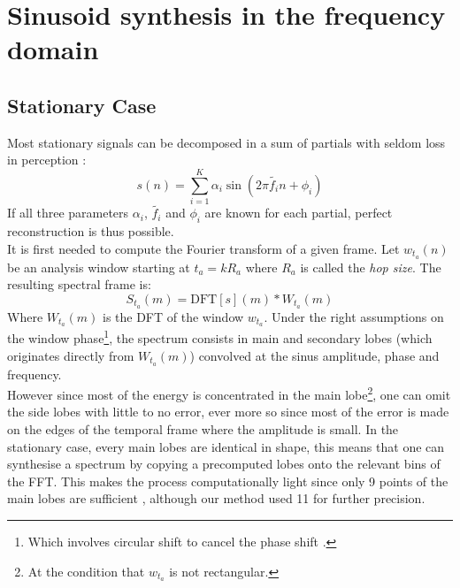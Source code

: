 \documentclass[]{article}
\begin{document}
\section{Sinusoid synthesis in the frequency domain}

\subsection{Stationary Case}
\hspace{15pt}Most stationary signals can be decomposed in a sum of partials with seldom loss in perception :
\begin{equation}
s(n) = \sum_{i=1}^{K}\alpha_i \sin(2\pi \tilde{f_i} n + \phi_{i})
\end{equation}
If all three parameters $\alpha_i$, $\tilde{f_i}$ and $\phi_{i}$ are known for each partial, perfect reconstruction is thus possible.\\
It is first needed to compute the Fourier transform of a given frame. Let $w_{t_a}(n)$ be an analysis window starting at $t_a = kR_a$ where $R_a$ is called the \emph{hop size}. The resulting spectral frame is:
\begin{equation}
S_{t_a}(m) = \text{DFT}[s](m) \ast W_{t_a}(m)
\end{equation}
Where $W_{t_a}(m)$ is the DFT of the window $w_{t_a}$. Under the right assumptions on the window phase\footnote{Which involves circular shift to cancel the phase shift \cite{arfib2002time}.}, the spectrum consists in main and secondary lobes (which originates directly from $W_{t_a}(m)$) convolved at the sinus amplitude, phase and frequency.\\
However since most of the energy is concentrated in the main lobe\footnote{At the condition that $w_{t_a}$ is not rectangular.}, one can omit the side lobes with little to no error, ever more so since most of the error is made on the edges of the temporal frame where the amplitude is small. In the stationary case, every main lobes are identical in shape, this means that one can synthesise a spectrum by copying a precomputed lobes onto the relevant bins of the FFT. This makes the process computationally light since only 9 points of the main lobes are sufficient \cite{rodet1992spectral}, although our method used 11 for further precision.\\
\end{document}

